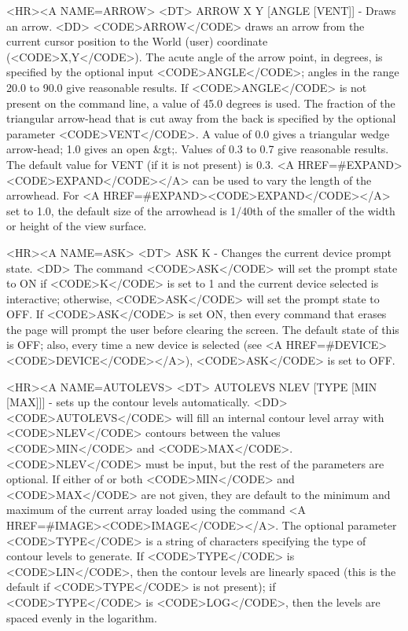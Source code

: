 \begin{rawhtml}
<HR><A NAME=ARROW>
<DT>
ARROW X Y [ANGLE [VENT]] - Draws an arrow.
<DD>
	<CODE>ARROW</CODE> draws an arrow from the current cursor
	position to the World (user) coordinate (<CODE>X,Y</CODE>).
	The acute angle of the arrow point, in degrees, is specified by
	the optional input <CODE>ANGLE</CODE>; angles in the range
	20.0 to 90.0 give reasonable results.  If <CODE>ANGLE</CODE> is
	not present on the command line, a value of 45.0 degrees is used.
	The fraction of the triangular arrow-head that is cut away from the
	back is specified by the optional parameter <CODE>VENT</CODE>.
	A value of 0.0 gives a triangular wedge arrow-head; 1.0 gives
	an open &gt;.  Values of 0.3 to 0.7 give reasonable results.  The
	default value for VENT (if it is not present) is 0.3.
	<A HREF=#EXPAND><CODE>EXPAND</CODE></A> can be used to vary
	the length of the arrowhead.  For
	<A HREF=#EXPAND><CODE>EXPAND</CODE></A> set to 1.0, the default
	size of the arrowhead is 1/40th of the smaller of the width or
	height of the view surface.

<HR><A NAME=ASK>
<DT>
ASK K - Changes the current device prompt state.
<DD>
	The command <CODE>ASK</CODE> will set the prompt state to ON if
	<CODE>K</CODE> is set to 1 and the current device selected is
	interactive; otherwise, <CODE>ASK</CODE> will set the prompt
	state to OFF.  If <CODE>ASK</CODE> is set ON, then every command
	that erases the page will prompt the user before clearing the
	screen.  The default state of this is OFF; also, every time a new
	device is selected (see <A HREF=#DEVICE><CODE>DEVICE</CODE></A>),
	<CODE>ASK</CODE> is set to OFF.

<HR><A NAME=AUTOLEVS>
<DT>
AUTOLEVS NLEV [TYPE [MIN [MAX]]] - sets up the contour levels automatically.
<DD>
	<CODE>AUTOLEVS</CODE> will fill an internal contour level array
	with <CODE>NLEV</CODE> contours between the values <CODE>MIN</CODE>
	and <CODE>MAX</CODE>.  <CODE>NLEV</CODE> must be input, but the
	rest of the parameters are optional.  If either of or both
	<CODE>MIN</CODE> and <CODE>MAX</CODE> are not given, they are
	default to the minimum and maximum of the current array loaded
	using the command <A HREF=#IMAGE><CODE>IMAGE</CODE></A>.  The
	optional parameter <CODE>TYPE</CODE> is a string of characters
	specifying the type of contour levels to generate.  If
	<CODE>TYPE</CODE> is <CODE>LIN</CODE>, then the contour levels
	are linearly spaced (this is the default if <CODE>TYPE</CODE>
	is not present); if <CODE>TYPE</CODE> is <CODE>LOG</CODE>, then
	the levels are spaced evenly in the logarithm.


\end{rawhtml}
